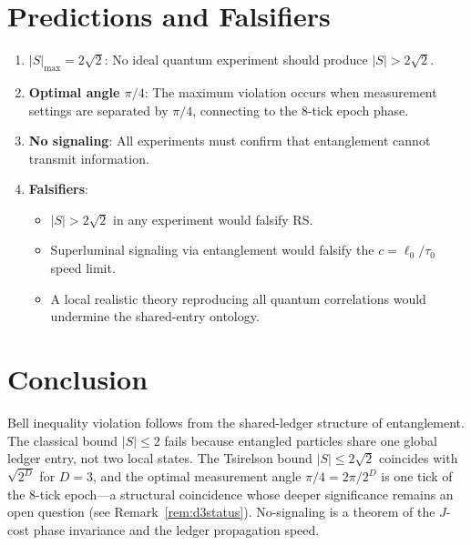 \documentclass[12pt,a4paper]{article}
\theoremstyle{definition}
\theoremstyle{remark}
\begin{document}
\section{Predictions and Falsifiers}
\label{sec:predictions}

\begin{enumerate}
  \item \textbf{$|S|_{\max} = 2\sqrt{2}$}: No ideal quantum
  experiment should produce $|S| > 2\sqrt{2}$.

  \item \textbf{Optimal angle $\pi/4$}: The maximum violation
  occurs when measurement settings are separated by $\pi/4$,
  connecting to the 8-tick epoch phase.

  \item \textbf{No signaling}: All experiments must confirm
  that entanglement cannot transmit information.

  \item \textbf{Falsifiers}:
  \begin{itemize}[nosep]
    \item $|S| > 2\sqrt{2}$ in any experiment would falsify RS.
    \item Superluminal signaling via entanglement would falsify
    the $c = \ell_0/\tau_0$ speed limit.
    \item A local realistic theory reproducing all quantum
    correlations would undermine the shared-entry ontology.
  \end{itemize}
\end{enumerate}

\section{Conclusion}
\label{sec:conclusion}

Bell inequality violation follows from the shared-ledger
structure of entanglement.  The classical bound $|S| \leq 2$
fails because entangled particles share one global ledger
entry, not two local states.  The Tsirelson bound
$|S| \leq 2\sqrt{2}$ coincides with $\sqrt{2^D}$ for $D = 3$,
and the optimal measurement angle
$\pi/4 = 2\pi/2^D$ is one tick of the 8-tick epoch---a
structural coincidence whose deeper significance remains an
open question (see Remark~\ref{rem:d3status}).
No-signaling is a theorem of the $J$-cost phase invariance and
the ledger propagation speed.
\end{document}
